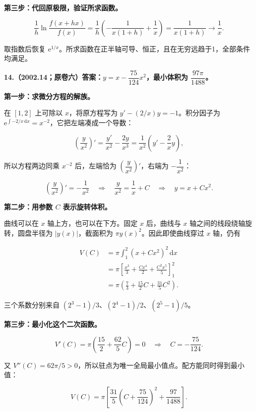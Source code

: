 \documentclass[UTF8,11pt,fontset=windows]{ctexart}
\begin{document}
\textbf{第三步：代回原极限，验证所求函数。}

$$
\frac1h\ln\frac{f(x+hx)}{f(x)}
=\frac1h\left(-\frac1{x(1+h)}+\frac1x\right)
=\frac1{x(1+h)}\longrightarrow\frac1x.
$$

取指数后恢复 $\mathrm e^{1/x}$。所求函数在正半轴可导、恒正，且在无穷远趋于1，全部条件均满足。

\clearpage

\textbf{14.（2002.14；原卷六）答案：$y=x-\dfrac{75}{124}x^2$，最小体积为 $\dfrac{97\pi}{1488}$。}

\textbf{第一步：求微分方程的解族。}

在 $[1,2]$ 上可除以 $x$，将原方程写为 $y'-(2/x)y=-1$。积分因子为 $\mathrm e^{\int-2/x\,\mathrm dx}=x^{-2}$，它把左端凑成一个导数：

$$
\left(\frac y{x^2}\right)'
=\frac{y'}{x^2}-\frac{2y}{x^3}
=\frac1{x^2}\left(y'-\frac2xy\right),
$$

所以方程两边同乘 $x^{-2}$ 后，左端恰为 $\left(\dfrac y{x^2}\right)'$，右端为 $-\dfrac1{x^2}$：

$$
\left(\frac y{x^2}\right)'=-\frac1{x^2}
\quad\Longrightarrow\quad
\frac y{x^2}=\frac1x+C
\quad\Longrightarrow\quad y=x+Cx^2.
$$

\textbf{第二步：用参数 $C$ 表示旋转体积。}

曲线可以在 $x$ 轴上方，也可以在下方。固定 $x$ 后，曲线与 $x$ 轴之间的线段绕轴旋转，圆盘半径为 $|y(x)|$，截面积为 $\pi y(x)^2$。因此即使曲线穿过 $x$ 轴，仍有

$$
\begin{aligned}
V(C)&=\pi\int_1^2(x+Cx^2)^2\,\mathrm dx\\
&=\pi\left[\frac{x^3}{3}+\frac{Cx^4}{2}+\frac{C^2x^5}{5}\right]_1^2\\
&=\pi\left(\frac73+\frac{15}{2}C+\frac{31}{5}C^2\right).
\end{aligned}
$$

三个系数分别来自 $(2^3-1)/3$、$(2^4-1)/2$、$(2^5-1)/5$。

\textbf{第三步：最小化这个二次函数。}

$$
V'(C)=\pi\left(\frac{15}{2}+\frac{62}{5}C\right)=0
\quad\Longrightarrow\quad C=-\frac{75}{124}.
$$

又 $V''(C)=62\pi/5>0$，所以驻点为唯一全局最小值点。配方能同时得到最小值：

$$
V(C)=\pi\left[\frac{31}{5}\left(C+\frac{75}{124}\right)^2+\frac{97}{1488}\right].
$$
\end{document}
